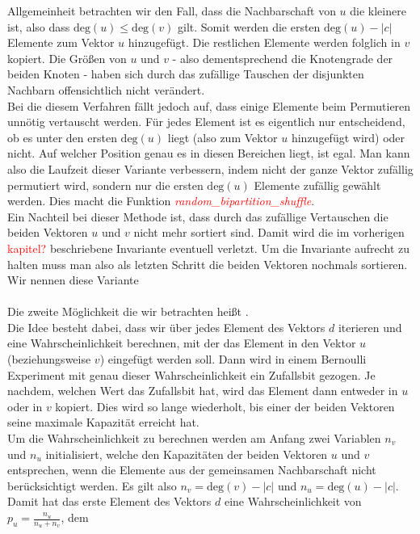 Allgemeinheit betrachten wir den Fall, dass die Nachbarschaft von $u$ die kleinere ist, also dass 
$\text{deg}(u) \le \text{deg}(v)$ gilt. Somit werden die ersten $\text{deg}(u)-|c|$ Elemente zum 
Vektor $u$ hinzugefügt. Die restlichen
Elemente werden folglich in $v$ kopiert.
Die Größen von $u$ und $v$ - also dementsprechend die Knotengrade der beiden Knoten - haben sich durch das
zufällige Tauschen der disjunkten Nachbarn offensichtlich
nicht verändert.
\\
Bei die diesem Verfahren fällt  jedoch auf, dass einige Elemente beim Permutieren unnötig vertauscht werden.
Für jedes Element ist es eigentlich nur entscheidend, ob es unter den ersten $\text{deg}(u)$  liegt (also zum Vektor
$u$ hinzugefügt wird) oder nicht. Auf welcher Position genau es in diesen Bereichen liegt, ist egal. Man
kann also die Laufzeit dieser Variante verbessern, indem nicht der ganze Vektor zufällig permutiert 
wird, sondern nur die ersten $\text{deg}(u)$ Elemente zufällig gewählt werden. Dies macht die Funktion 
\textcolor{red}{\textit{random\_bipartition\_shuffle}}.
\\
Ein Nachteil bei dieser Methode ist, dass durch das zufällige Vertauschen die beiden Vektoren
$u$ und $v$ nicht mehr sortiert sind. Damit wird die im vorherigen \textcolor{red}{kapitel?} beschriebene
Invariante eventuell verletzt. Um die Invariante aufrecht zu halten muss man also als letzten Schritt
die beiden Vektoren nochmals sortieren.
Wir nennen diese Variante \perm
\\
\\
Die zweite Möglichkeit die wir betrachten heißt \distr.
\\
Die Idee besteht dabei, dass wir über jedes Element des Vektors $d$ iterieren und eine Wahrscheinlichkeit
berechnen, mit
der das Element in den Vektor $u$ (beziehungsweise $v$) eingefügt werden soll. Dann wird in einem 
Bernoulli Experiment mit genau dieser Wahrscheinlichkeit ein Zufallsbit gezogen. Je nachdem, welchen
Wert das Zufallsbit hat, wird das Element dann entweder in $u$ oder in $v$ kopiert. Dies wird so lange
wiederholt, bis einer der beiden Vektoren seine maximale Kapazität erreicht hat. 
\\
Um die Wahrscheinlichkeit zu berechnen werden am Anfang zwei Variablen $n_v$ und $n_u$ initialisiert, 
welche den Kapazitäten der beiden Vektoren $u$ und $v$ entsprechen, wenn die Elemente aus der 
gemeinsamen Nachbarschaft nicht berücksichtigt werden. Es gilt also $n_v = \text{deg}(v) - |c|$ und
$n_u= \text{deg}(u) - |c|$.
Damit hat das erste Element des Vektors $d$ eine Wahrscheinlichkeit von $p_u = \frac{n_u}{n_u+n_v}$, dem

